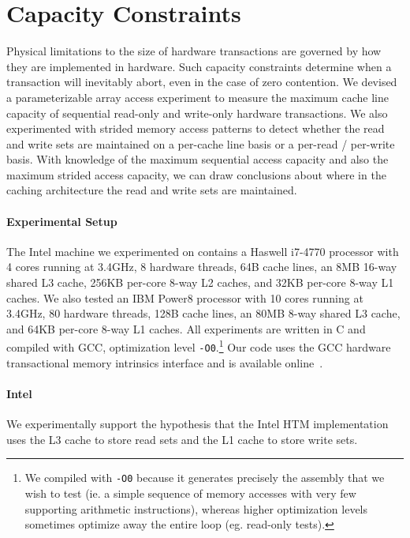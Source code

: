 \section{Capacity Constraints}
\label{sec:capacity}
Physical limitations to the size of hardware 
transactions are
governed by how they are implemented in hardware. 
Such capacity constraints
determine when a transaction will inevitably abort, 
even in the case of zero contention. We 
devised a parameterizable array access
experiment to measure the maximum cache line capacity 
of sequential read-only and write-only
hardware transactions. We also experimented with strided 
memory access patterns
to detect whether the read and write sets are maintained
on a per-cache line basis or a per-read / per-write basis.
With knowledge of the maximum sequential access 
capacity and also the maximum
strided access capacity, we can draw conclusions 
about where in the caching
architecture the read and write sets are 
maintained. 

\paragraph{Experimental Setup}
The Intel machine we experimented on contains a Haswell i7-4770 processor with 4
cores running at 3.4GHz, 8 hardware threads, 64B cache lines, an 8MB 16-way
shared L3 cache, 256KB per-core 8-way L2 caches, and 32KB per-core 8-way L1
caches. We also tested an IBM Power8 processor with 10 cores running at 3.4GHz,
80 hardware threads, 128B cache lines, an 80MB 8-way shared L3 cache, and 64KB
per-core 8-way L1 caches. All experiments are written in C and compiled with
GCC, optimization level \texttt{-O0}.\footnote{We compiled with \texttt{-O0}
because it generates precisely the assembly that we wish to test (ie. a simple
sequence of memory accesses with very few supporting arithmetic instructions), whereas
higher optimization levels sometimes optimize away the entire loop (eg.
read-only tests).} Our code uses the GCC
hardware transactional memory intrinsics interface and is available
online~\cite{Nguyen15}.

\paragraph{Intel}
We experimentally support the hypothesis
that the Intel HTM implementation uses the L3 cache to 
store read sets and the L1 cache to store write sets.

